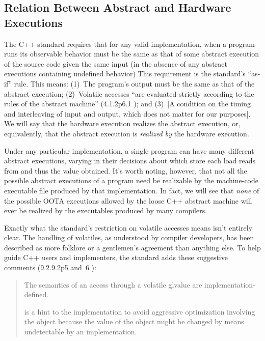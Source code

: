 \subsection{Relation Between Abstract and Hardware Executions}
\label{sec:Relation Between Abstract and Hardware Executions}

The C++ standard requires that for any valid implementation, when a
program runs its observable behavior must be the same as that of some
abstract execution of the source code given the same input (in the
absence of any abstract executions containing undefined behavior)
This requirement is the standard's ``as-if'' rule.
This means:
(1)~The program's output must be the same as that of the abstract execution;
(2)~Volatile accesses ``are evaluated strictly according to the
rules of the abstract machine'' (4.1.2p6.1 ); and
(3)~[A condition on the timing and interleaving of input and output,
which does not matter for our purposes].
We will say that the hardware execution realizes the abstract execution,
or, equivalently, that the abstract execution is \emph{realized by}
the hardware execution.

Under any particular implementation,
a single program can have many different abstract executions,
varying in their decisions about which store each load reads from
and thus the value obtained.
It's worth noting, however, that not all the possible abstract executions
of a program need be realizable by the machine-code executable file
produced by that implementation.
In fact, we will see that \emph{none} of the possible OOTA executions
allowed by the loose C++ abstract machine will ever be realized
by the executables produced by many compilers.

Exactly what the standard's restriction on volatile accesses means
isn't entirely clear.
The handling of volatiles, as understood by compiler developers, has
been described as more folklore or a gentlemen's agreement than
anything else.
To help guide C++ users and implementers, the standard adds these
suggestive comments (9.2.9.2p5 and~6 ):
\begin{quote}
	The semantics of an access through a volatile glvalue are
	implementation-defined.

	 is a hint to the implementation to avoid aggressive
	optimization involving the object because the value of the object
	might be changed by means undetectable by an implementation.
\end{quote}

